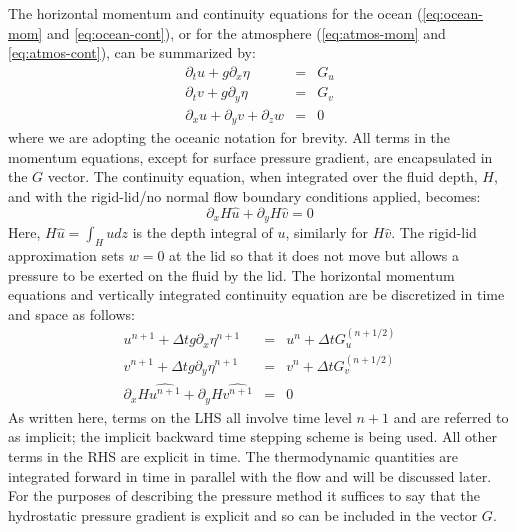 The horizontal momentum and continuity equations for the ocean
(\ref{eq:ocean-mom} and \ref{eq:ocean-cont}), or for the atmosphere
(\ref{eq:atmos-mom} and \ref{eq:atmos-cont}), can be summarized by:
\begin{eqnarray}
\partial_t u + g \partial_x \eta & = & G_u \\
\partial_t v + g \partial_y \eta & = & G_v \\
\partial_x u + \partial_y v + \partial_z w & = & 0
\end{eqnarray}
where we are adopting the oceanic notation for brevity. All terms in
the momentum equations, except for surface pressure gradient, are
encapsulated in the $G$ vector. The continuity equation, when
integrated over the fluid depth, $H$, and with the rigid-lid/no normal
flow boundary conditions applied, becomes:
\begin{equation}
\partial_x H \widehat{u} + \partial_y H \widehat{v} = 0
\label{eq:rigid-lid-continuity}
\end{equation}
Here, $H\widehat{u} = \int_H u dz$ is the depth integral of $u$,
similarly for $H\widehat{v}$. The rigid-lid approximation sets $w=0$
at the lid so that it does not move but allows a pressure to be
exerted on the fluid by the lid. The horizontal momentum equations and
vertically integrated continuity equation are be discretized in time
and space as follows:
\begin{eqnarray}
u^{n+1} + \Delta t g \partial_x \eta^{n+1}
& = & u^{n} + \Delta t G_u^{(n+1/2)}
\label{eq:discrete-time-u}
\\
v^{n+1} + \Delta t g \partial_y \eta^{n+1}
& = & v^{n} + \Delta t G_v^{(n+1/2)}
\label{eq:discrete-time-v}
\\
  \partial_x H \widehat{u^{n+1}}
+ \partial_y H \widehat{v^{n+1}} & = & 0
\label{eq:discrete-time-cont-rigid-lid}
\end{eqnarray}
As written here, terms on the LHS all involve time level $n+1$ and are
referred to as implicit; the implicit backward time stepping scheme is
being used. All other terms in the RHS are explicit in time. The
thermodynamic quantities are integrated forward in time in parallel
with the flow and will be discussed later. For the purposes of
describing the pressure method it suffices to say that the hydrostatic
pressure gradient is explicit and so can be included in the vector
$G$.

